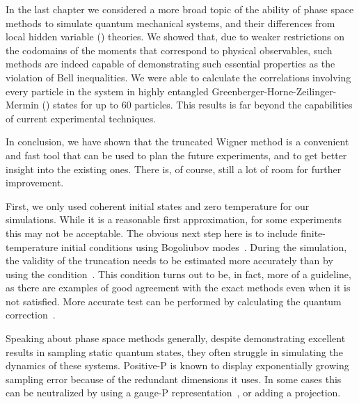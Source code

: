 In the last chapter we considered a more broad topic of the ability of phase space methods to simulate quantum mechanical systems, and their differences from local hidden variable () theories.
We showed that, due to weaker restrictions on the codomains of the moments that correspond to physical observables, such methods are indeed capable of demonstrating such essential  properties as the violation of Bell inequalities.
We were able to calculate the correlations involving every particle in the system in highly entangled Greenberger-Horne-Zeilinger-Mermin () states for up to 60 particles.
This results is far beyond the capabilities of current experimental techniques.

\centerline{\vfleuron}

In conclusion, we have shown that the truncated Wigner method is a convenient and fast tool that can be used to plan the future experiments, and to get better insight into the existing ones.
There is, of course, still a lot of room for further improvement.

First, we only used coherent initial states and zero temperature for our simulations.
While it is a reasonable first approximation, for some experiments this may not be acceptable.
The obvious next step here is to include finite-temperature initial conditions using Bogoliubov modes~\cite{Steel1998,Sinatra2002,Ruostekoski2005,Isella2006,Blakie2008}.
During the simulation, the validity of the truncation needs to be estimated more accurately than by using the condition~.
This condition turns out to be, in fact, more of a guideline, as there are examples of good agreement with the exact methods even when it is not satisfied.
More accurate test can be performed by calculating the quantum correction~\cite{Polkovnikov2010}.

Speaking about phase space methods generally, despite demonstrating excellent results in sampling static quantum states, they often struggle in simulating the dynamics of these systems.
Positive-P is known to display exponentially growing sampling error because of the redundant dimensions it uses.
In some cases this can be neutralized by using a gauge-P representation~\cite{Deuar2002,Deuar2005a}, or adding a projection.

